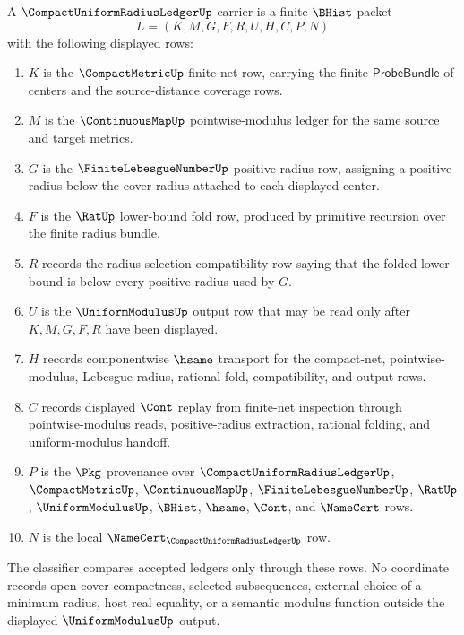 \begin{definition}
\label{def:compact-uniform-radius-ledger-carrier}
A $\CompactUniformRadiusLedgerUp$ carrier is a finite $\BHist$ packet
$$
L=(K,M,G,F,R,U,H,C,P,N)
$$
with the following displayed rows:
\begin{enumerate}
\item $K$ is the $\CompactMetricUp$ finite-net row, carrying the finite $\mathsf{ProbeBundle}$ of centers and the source-distance coverage rows.
\item $M$ is the $\ContinuousMapUp$ pointwise-modulus ledger for the same source and target metrics.
\item $G$ is the $\FiniteLebesgueNumberUp$ positive-radius row, assigning a positive radius below the cover radius attached to each displayed center.
\item $F$ is the $\RatUp$ lower-bound fold row, produced by primitive recursion over the finite radius bundle.
\item $R$ records the radius-selection compatibility row saying that the folded lower bound is below every positive radius used by $G$.
\item $U$ is the $\UniformModulusUp$ output row that may be read only after $K,M,G,F,R$ have been displayed.
\item $H$ records componentwise $\hsame$ transport for the compact-net, pointwise-modulus, Lebesgue-radius, rational-fold, compatibility, and output rows.
\item $C$ records displayed $\Cont$ replay from finite-net inspection through pointwise-modulus reads, positive-radius extraction, rational folding, and uniform-modulus handoff.
\item $P$ is the $\Pkg$ provenance over $\CompactUniformRadiusLedgerUp$, $\CompactMetricUp$, $\ContinuousMapUp$, $\FiniteLebesgueNumberUp$, $\RatUp$, $\UniformModulusUp$, $\BHist$, $\hsame$, $\Cont$, and $\NameCert$ rows.
\item $N$ is the local $\NameCert_{\CompactUniformRadiusLedgerUp}$ row.
\end{enumerate}
The classifier compares accepted ledgers only through these rows. No coordinate records open-cover compactness, selected subsequences, external choice of a minimum radius, host real equality, or a semantic modulus function outside the displayed $\UniformModulusUp$ output.
\end{definition}

